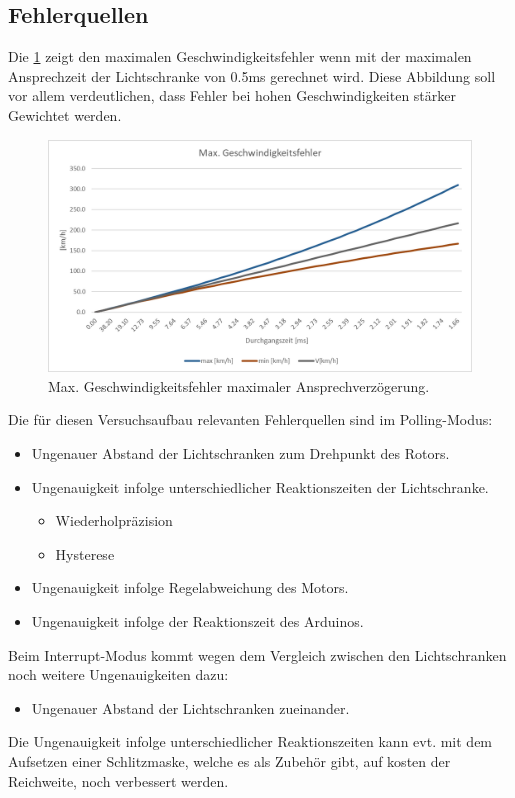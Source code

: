 \clearpage
\subsection{Fehlerquellen}
Die \ref{fig:AuswertungZeitfehler} zeigt den maximalen Geschwindigkeitsfehler wenn mit der maximalen Ansprechzeit der Lichtschranke von 0.5ms gerechnet wird. Diese Abbildung soll vor allem verdeutlichen, dass Fehler bei hohen Geschwindigkeiten stärker Gewichtet werden.

\begin{figure}[ht]
    \centering
    \includegraphics[width=\textwidth]{images/Zeitfehler.png}
    \caption{Max. Geschwindigkeitsfehler maximaler Ansprechverzögerung.}
    \label{fig:AuswertungZeitfehler}
\end{figure}

Die für diesen Versuchsaufbau relevanten Fehlerquellen sind im Polling-Modus:
\begin{itemize}
    \item Ungenauer Abstand der Lichtschranken zum Drehpunkt des Rotors.
    \item Ungenauigkeit infolge unterschiedlicher Reaktionszeiten der Lichtschranke.
    \begin{itemize}
        \item Wiederholpräzision
        \item Hysterese
    \end{itemize}
    \item Ungenauigkeit infolge Regelabweichung des Motors.
    \item Ungenauigkeit infolge der Reaktionszeit des Arduinos.
\end{itemize}

Beim Interrupt-Modus kommt wegen dem Vergleich zwischen den Lichtschranken noch weitere Ungenauigkeiten dazu:
\begin{itemize}
    \item Ungenauer Abstand der Lichtschranken zueinander.
\end{itemize}

Die Ungenauigkeit infolge unterschiedlicher Reaktionszeiten kann evt. mit dem Aufsetzen einer Schlitzmaske, welche es als Zubehör gibt, auf kosten der Reichweite, noch verbessert werden. \\
\\


